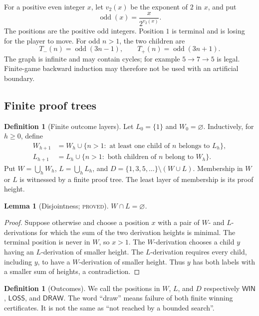 \documentclass[11pt]{article}
\newtheorem{lemma}[theorem]{Lemma}
\theoremstyle{definition}
\newtheorem{definition}[theorem]{Definition}
\newcommand{\odd}{\operatorname{odd}}
\newcommand{\Win}{\mathsf{WIN}}
\newcommand{\Loss}{\mathsf{LOSS}}
\newcommand{\Draw}{\mathsf{DRAW}}
\newcommand{\vTwo}{v_2}
\newcommand{\proved}{\textsc{proved}}
\begin{document}
For a positive even integer $x$, let $\vTwo(x)$ be the exponent of $2$ in
$x$, and put
\[
  \odd(x)=\frac{x}{2^{\vTwo(x)}}.
\]
The positions are the positive odd integers.  Position $1$ is terminal and is
losing for the player to move.  For odd $n>1$, the two children are
\[
  T_-(n)=\odd(3n-1),\qquad T_+(n)=\odd(3n+1).
\]
The graph is infinite and may contain cycles; for example
$5\to7\to5$ is legal.  Finite-game backward induction may therefore not be
used with an artificial boundary.

\subsection{Finite proof trees}

\begin{definition}[Finite outcome layers]
Let $L_0=\{1\}$ and $W_0=\varnothing$.  Inductively, for $h\ge0$, define
\begin{align*}
 W_{h+1}&=W_h\cup
 \{n>1:\text{ at least one child of $n$ belongs to $L_h$}\},\\
 L_{h+1}&=L_h\cup
 \{n>1:\text{ both children of $n$ belong to $W_h$}\}.
\end{align*}
Put $W=\bigcup_hW_h$, $L=\bigcup_hL_h$, and
$D=\{1,3,5,\ldots\}\setminus(W\cup L)$.
Membership in $W$ or $L$ is witnessed by a finite proof tree.  The least layer
of membership is its proof height.
\end{definition}

\begin{lemma}[Disjointness; \proved]\label{lem:disjoint}
$W\cap L=\varnothing$.
\end{lemma}

\begin{proof}
Suppose otherwise and choose a position $x$ with a pair of $W$- and
$L$-derivations for which the sum of the two derivation heights is minimal.
The terminal position is never in $W$, so $x>1$.  The $W$-derivation chooses
a child $y$ having an $L$-derivation of smaller height.  The $L$-derivation
requires every child, including $y$, to have a $W$-derivation of smaller
height.  Thus $y$ has both labels with a smaller sum of heights, a
contradiction.
\end{proof}

\begin{definition}[Outcomes]
We call the positions in $W$, $L$, and $D$ respectively $\Win$, $\Loss$, and
$\Draw$.  The word ``draw'' means failure of both finite winning
certificates.  It is not the same as ``not reached by a bounded search''.
\end{definition}
\end{document}
